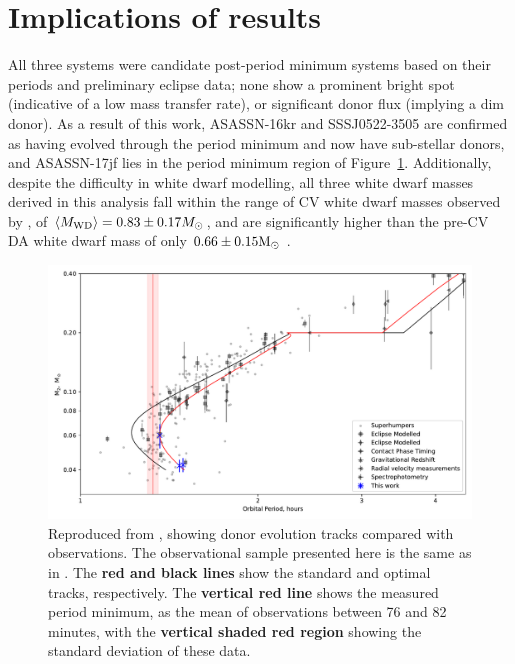 \section{Implications of results}
\label{sect:discussion:three CVs with peculiar white dwarf colours}

All three systems were candidate post-period minimum systems based on their periods and preliminary eclipse data; none show a prominent bright spot (indicative of a low mass transfer rate), or significant donor flux (implying a dim donor).
As a result of this work, ASASSN-16kr and SSSJ0522-3505 are confirmed as having evolved through the period minimum and now have sub-stellar donors, and ASASSN-17jf lies in the period minimum region of Figure~\ref{fig:M2_vs_P}.
Additionally, despite the difficulty in white dwarf modelling, all three white dwarf masses derived in this analysis fall within the range of CV white dwarf masses observed by \citet{pala2020}, of $\langle M_{\rm WD}\rangle = 0.83 \pm 0.17 M_\odot$, and are significantly higher than the pre-CV DA white dwarf mass of only $0.66 \pm 0.15 {\rm M_\odot}$ \citep{mccleery2020}.
\begin{figure}
    \centering
    \includegraphics[width=\textwidth]{figures/results/three_cvs_with_weird_colours/GeneralFigs/M2_vs_P_withhumpers.pdf}
    \caption{Reproduced from \citet{wild2021}, showing donor evolution tracks compared with observations. The observational sample presented here is the same as in \citet{wild2021}. The {\bf red and black lines} show the \citet{knigge11} standard and optimal tracks, respectively. The {\bf vertical red line} shows the measured period minimum, as the mean of observations between 76 and 82 minutes, with the {\bf vertical shaded red region} showing the standard deviation of these data.}
    \label{fig:M2_vs_P}
\end{figure}


